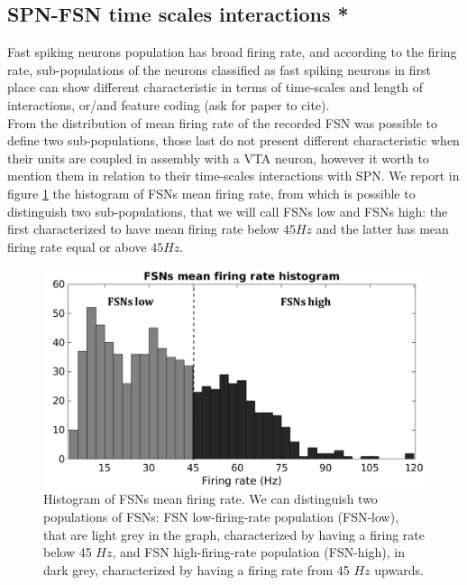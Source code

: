 \subsection{SPN-FSN time scales interactions *}
\label{sec:SPN-FSN_Bin}
Fast spiking neurons population has broad firing rate, and according to the firing rate, sub-populations of the neurons classified as fast spiking neurons in first place can show different characteristic in terms of time-scales and length of interactions, or/and feature coding ({\color{red}ask for paper to cite}).\\From the distribution of mean firing rate of the recorded FSN was possible to define two sub-populations, those last do not present different characteristic when their units are coupled in assembly with a VTA neuron, however it worth to mention them in relation to their time-scales interactions with SPN. We report in figure \ref{fig:FSNsFireHisto} the histogram of FSNs mean firing rate, from which is possible to distinguish two sub-populations, that we will call FSNs low and FSNs high: the first characterized to have mean firing rate below $45 Hz$ and the latter has mean firing rate equal or above $45 Hz$.\\
\begin{figure}
    \centering
    \includegraphics[scale=0.6]{figures/FSNFiringRateLightDark.pdf}
    \caption{Histogram of FSNs mean firing rate. We can distinguish two populations of FSNs: FSN low-firing-rate population (FSN-low), that are light grey in the graph, characterized by having a firing rate below 45 $Hz$, and FSN high-firing-rate population (FSN-high), in dark grey, characterized by having a firing rate from 45 $Hz$ upwards.}
    \label{fig:FSNsFireHisto}
\end{figure}
